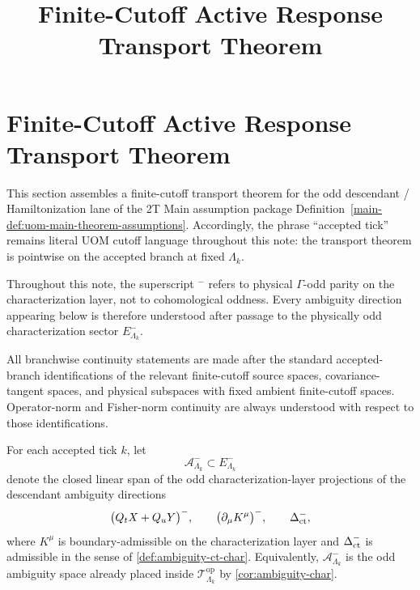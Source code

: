 \documentclass[11pt]{article}
\title{Finite-Cutoff Active Response Transport Theorem}
\author{}
\date{}
\begin{document}
\maketitle
\fi

\section{Finite-Cutoff Active Response Transport Theorem}
\label{sec:active-response-transport-program}

This section assembles a finite-cutoff transport theorem for the odd descendant / Hamiltonization
lane of the 2T Main assumption package Definition~\ref{main-def:uom-main-theorem-assumptions}.
Accordingly, the phrase ``accepted tick'' remains literal UOM cutoff language throughout this note:
the transport theorem is pointwise on the accepted branch at fixed \(\Lambda_k\).

\begin{remark}
\label{rem:transport-conventions}
Throughout this note, the superscript \({}^-\) refers to physical \(\Gamma\)-odd parity on the
characterization layer, not to cohomological oddness.
Every ambiguity direction appearing below is therefore understood after passage to the physically
odd characterization sector \(E^-_{\Lambda_k}\).

All branchwise continuity statements are made after the standard accepted-branch identifications of
the relevant finite-cutoff source spaces, covariance-tangent spaces, and physical subspaces with
fixed ambient finite-cutoff spaces.
Operator-norm and Fisher-norm continuity are always understood with respect to those identifications.
\end{remark}

\begin{definition}
\label{def:transport-ambiguity-subspace}
For each accepted tick \(k\), let
\[
\mathcal A^-_{\Lambda_k}\subset E^-_{\Lambda_k}
\]
denote the closed linear span of the odd characterization-layer projections of the descendant
ambiguity directions
\[
\big(Q_tX+Q_uY\big)^-,\qquad \big(\partial_\mu K^\mu\big)^-,\qquad \Delta_{\rm ct}^{-},
\]
where \(K^\mu\) is boundary-admissible on the characterization layer and
\(\Delta_{\rm ct}^{-}\) is admissible in the sense of \cref{def:ambiguity-ct-char}.
Equivalently, \(\mathcal A^-_{\Lambda_k}\) is the odd ambiguity space already placed inside
\(\mathcal T^{\mathrm{op}}_{\Lambda_k}\) by \cref{cor:ambiguity-char}.
\end{definition}
\end{document}
